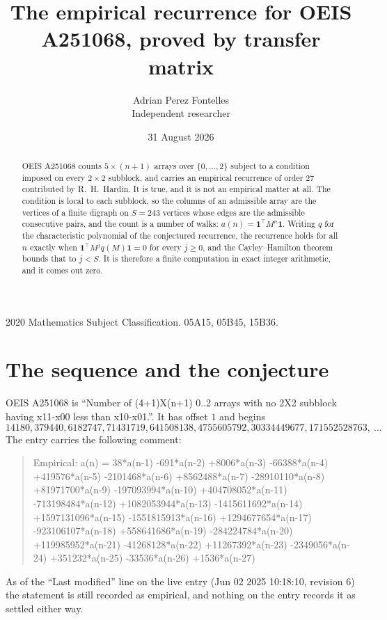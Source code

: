 \documentclass[11pt,a4paper]{article}
\title{The empirical recurrence for OEIS A251068, proved by transfer matrix}
\author{Adrian Perez Fontelles\\ \small Independent researcher}
\date{31 August 2026}
\theoremstyle{plain}
\theoremstyle{definition}
\begin{document}
\maketitle

\begin{abstract}
OEIS A251068 counts $5\times(n+1)$ arrays over $\{0,\dots,2\}$ subject to a condition imposed on
every $2\times2$ subblock, and carries an empirical recurrence of order $27$ contributed
by R.~H.~Hardin. It is true, and it is not an empirical matter at all. The condition is local
to each subblock, so the columns of an admissible array are the vertices of a finite digraph
on $S=243$ vertices whose edges are the admissible consecutive pairs, and the count is a
number of walks: $a(n)=\mathbf{1}^{\!\top}M^{n}\mathbf{1}$. Writing $q$
for the characteristic polynomial of the conjectured recurrence, the recurrence holds for all
$n$ exactly when $\mathbf{1}^{\!\top}M^{j}q(M)\mathbf{1}=0$ for every $j\ge0$, and the
Cayley--Hamilton theorem bounds that to $j<S$. It is therefore a finite computation in exact
integer arithmetic, and it comes out zero.
\end{abstract}

\noindent\small 2020 Mathematics Subject Classification. 05A15, 05B45, 15B36.\normalsize

\section{The sequence and the conjecture}

OEIS A251068 is ``Number of (4+1)X(n+1) 0..2 arrays with no 2X2 subblock having x11-x00 less than x10-x01.''. It has offset $1$ and begins
\[
14180, 379440, 6182747, 71431719, 641508138, 4755605792, 30334449677, 171552528763,\ \dots
\]
The entry carries the following comment:
\begin{quote}\small
Empirical: a(n) = 38*a(n-1) -691*a(n-2) +8006*a(n-3) -66388*a(n-4) +419576*a(n-5) -2101468*a(n-6) +8562488*a(n-7) -28910110*a(n-8) +81971700*a(n-9) -197093994*a(n-10) +404708052*a(n-11) -713198484*a(n-12) +1082053944*a(n-13) -1415611692*a(n-14) +1597131096*a(n-15) -1551815913*a(n-16) +1294677654*a(n-17) -923106107*a(n-18) +558641686*a(n-19) -284224784*a(n-20) +119985952*a(n-21) -41268128*a(n-22) +11267392*a(n-23) -2349056*a(n-24) +351232*a(n-25) -33536*a(n-26) +1536*a(n-27)
\end{quote}
As of the ``Last modified'' line on the live entry (Jun 02 2025 10:18:10, revision 6) the statement is
still recorded as empirical, and nothing on the entry records it as settled either way.
\end{document}
